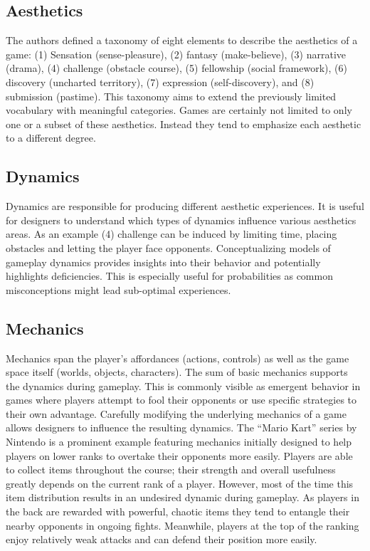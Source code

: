 \subsection{Aesthetics}
The authors defined a taxonomy of eight elements to describe the aesthetics of a game: (1) Sensation (sense-pleasure), (2) fantasy (make-believe), (3) narrative (drama), (4) challenge (obstacle course), (5) fellowship (social framework), (6) discovery (uncharted territory), (7) expression (self-discovery), and (8) submission (pastime).
This taxonomy aims to extend the previously limited vocabulary with meaningful categories.
Games are certainly not limited to only one or a subset of these aesthetics.
Instead they tend to emphasize each aesthetic to a different degree.

\subsection{Dynamics}
Dynamics are responsible for producing different aesthetic experiences.
It is useful for designers to understand which types of dynamics influence various aesthetics areas.
As an example (4) challenge can be induced by limiting time, placing obstacles and letting the player face opponents.
Conceptualizing models of gameplay dynamics provides insights into their behavior and potentially highlights deficiencies.
This is especially useful for probabilities as common misconceptions might lead sub-optimal experiences.

\subsection{Mechanics}
Mechanics span the player's affordances (actions, controls) as well as the game space itself (worlds, objects, characters).
The sum of basic mechanics supports the dynamics during gameplay.
This is commonly visible as emergent behavior in games where players attempt to fool their opponents or use specific strategies to their own advantage.
Carefully modifying the underlying mechanics of a game allows designers to influence the resulting dynamics.
The ``Mario Kart'' series by Nintendo is a prominent example featuring mechanics initially designed to help players on lower ranks to overtake their opponents more easily.
Players are able to collect items throughout the course; their strength and overall usefulness greatly depends on the current rank of a player.
However, most of the time this item distribution results in an undesired dynamic during gameplay.
As players in the back are rewarded with powerful, chaotic items they tend to entangle their nearby opponents in ongoing fights.
Meanwhile, players at the top of the ranking enjoy relatively weak attacks and can defend their position more easily.